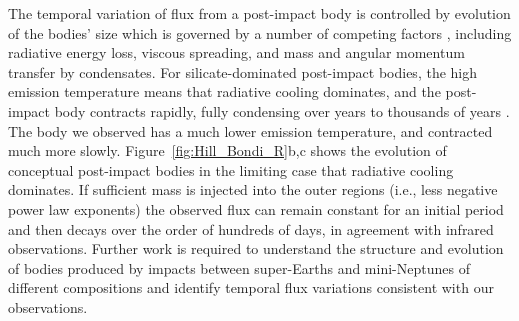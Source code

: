 \documentclass[sn-nature,oneside]{sn-jnl}%
\def\apss{Astrophys. Space Sci.}
\def\araa{Ann. Rev. Astron. Astrophys.}
\begin{document}
The temporal variation of flux from a post-impact body is controlled by evolution of the bodies' size which is governed by a number of competing factors \cite{Lock18,Lock2020}, including radiative energy loss, viscous spreading, and mass and angular momentum transfer by condensates.
%
For silicate-dominated post-impact bodies, the high emission temperature means that radiative cooling dominates, and the post-impact body contracts rapidly, fully condensing over years to thousands of years \cite{Lock18,Lock2020}.
%
The body we observed has a much lower emission temperature, and contracted much more slowly.
%
Figure~\ref{fig:Hill_Bondi_R}b,c shows the evolution of conceptual post-impact bodies in the limiting case that radiative cooling dominates.
%
If sufficient mass is injected into the outer regions (i.e., less negative power law exponents) the observed flux can remain constant for an initial period and then decays over the order of hundreds of days, in agreement with infrared observations.
%
Further work is required to understand the structure and evolution of bodies produced by impacts between super-Earths and mini-Neptunes of different compositions and identify temporal flux variations consistent with our observations.

\clearpage







\end{document}
